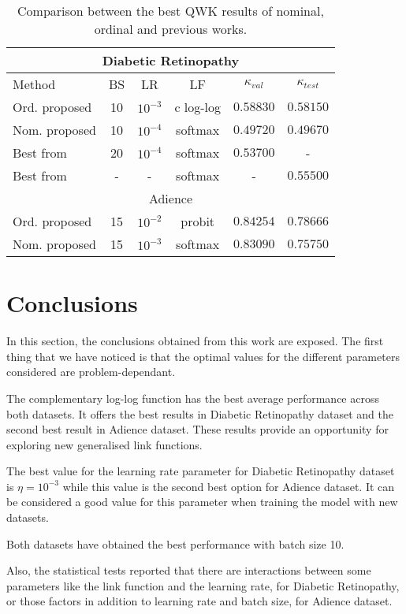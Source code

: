 \documentclass[journal]{IEEEtran}
\begin{document}
	\begin{table}[!t]
		\caption{Comparison between the best QWK results of nominal, ordinal and previous works.}
		\label{table:ComparisonNomOrd}
		\footnotesize
		\centering
		\begin{tabular}{lccc|cc}
			\multicolumn{6}{c}{Diabetic Retinopathy}\\
			\hline
			Method & BS & LR & LF & $\kappa_{val}$ & $\kappa_{test}$\\\hline
			Ord. proposed & 10 & $10^{-3}$ & c log-log & $0.58830$ & $0.58150$\\
			Nom. proposed & 10 & $10^{-4}$ & softmax & $0.49720$ & $0.49670$\\
			Best from \cite{de2018weighted} & 20 & $10^{-4}$ & softmax & $0.53700$ & -\\
			Best from \cite{nebot2016diabetic} & - & - & softmax & - & $0.55500$\\
			\hline\hline
			\multicolumn{6}{c}{Adience}\\
			\hline
			Ord. proposed & 15 & $10^{-2}$ & probit & $0.84254$ & $0.78666$\\
			Nom. proposed & 15 & $10^{-3}$ & softmax & $0.83090$ & $0.75750$\\
		\end{tabular}
	\end{table}
	
	\section{Conclusions}
	\label{sect:conclusions}
	In this section, the conclusions obtained from this work are exposed. The first thing that we have noticed is that the optimal values for the different parameters considered are problem-dependant. 
	
	The complementary log-log function has the best average performance across both datasets. It offers the best results in Diabetic Retinopathy dataset and the second best result in Adience dataset. These results provide an opportunity for exploring new generalised link functions.
	
	The best value for the learning rate parameter for  Diabetic Retinopathy dataset is $\eta = 10^{-3}$ while this value is the second best option for Adience dataset. It can be considered a good value for this parameter when training the model with new datasets.
	
	Both datasets have obtained the best performance with batch size 10.
	
	Also, the statistical tests reported that there are interactions between some parameters like the link function and the learning rate, for Diabetic Retinopathy, or those factors in addition to learning rate and batch size, for Adience dataset.
	
\end{document}
